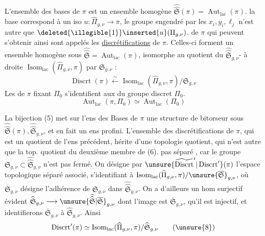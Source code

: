 L'ensemble des bases de $\pi$ est un ensemble homogène   $\widehat{\widehat{\mathfrak S}}(\pi)=\operatorname{Aut}_{\mathrm{lac}}(\pi)$.  la  base correspond à un iso $u:\widehat{\Pi}_{g,\nu}\longrightarrow\pi$, le groupe  engendré par les $x_i,y_i,\ell_j$ n'est autre que $\deleted{\illegible{1}}\inserted{u}(\Pi_{g,\nu})$.   de $\pi$ qui peuvent s'obtenir ainsi sont appelés les \uline{discrétifications} de $\pi$. Celles-ci forment un ensemble homogène sous $\widehat{\widehat{\mathfrak S}}=\operatorname{Aut}_{\mathrm{lac}}(\pi)$,  isomorphe au quotient du $\widehat{\widehat{\mathfrak S}}_{g,\nu}$- à droite $\operatorname{Isom}_{\mathrm{lac}}(\widehat{\Pi}_{g,\nu},\pi)$ par $\mathfrak S_{g,\nu}$ :
\[
\operatorname{Discrt}(\pi) \xleftarrow{\sim} \operatorname{Isom}_{\mathrm{lac}}(\widehat{\Pi}_{g,\nu},\pi)/\mathfrak S_{g,\nu}
\tag{6}
\]
Les   de $\pi$ fixant  $\Pi_0$ s'identifient aux  du groupe discret  $\Pi_0$.
\[
\operatorname{Aut}_{\mathrm{lac}}(\pi,\Pi_0)\simeq\operatorname{Aut}_{\mathrm{lac}}(\Pi_0)
\tag{7}
\]



La bijection (5) met sur l'ens des Bases de $\pi$ une structure de bitorseur sous $\widehat{\widehat{\mathfrak S}}(\pi),\widehat{\widehat{\mathfrak S}}_{g,\nu}$, et    en fait un ens profini. L'ensemble des discrétifications de $\pi$, qui est un quotient de l'ens précédent, hérite d'une topologie quotient, qui n'est autre que la top. quotient du deuxième membre de (6).   pas séparé , car le groupe $\mathfrak S_{g,\nu}\subset\widehat{\widehat{\mathfrak S}}_{g,\nu}$ n'est pas fermé. On désigne par $\unsure{\widetilde{\operatorname{Discrt}}'|\operatorname{Discrt}'}(\pi)$ l'espace topologique séparé associé, s'identifiant à $\operatorname{Isom}_{\mathrm{lac}}(\widehat{\Pi}_{g,\nu},\pi)/\unsure{\overline{\mathfrak S}}_{g,\nu}$, où $\overline{\mathfrak S}_{g,\nu}$ désigne l'adhérence de $\mathfrak S_{g,\nu}$ dans $\widehat{\widehat{\mathfrak S}}_{g,\nu}$. On a d'ailleurs un hom surjectif évident $\widehat{\mathfrak S}_{g,\nu}\longrightarrow\unsure{\widehat{\widehat{\mathfrak S}}|\overline{\mathfrak S}}_{g,\nu}$ dont l'image est $\overline{\mathfrak S}_{g,\nu}$,  qu'il est injectif, et identifierons $\overline{\mathfrak S}_{g,\nu}$ à $\widehat{\mathfrak S}_{g,\nu}$. Ainsi
\[
\operatorname{Discrt}'(\pi)\simeq\operatorname{Isom}_{\mathrm{lac}}(\widehat{\Pi}_{g,\nu},\pi)/\widehat{\mathfrak S}_{g,\nu}
\tag{\unsure{8}}
\]

